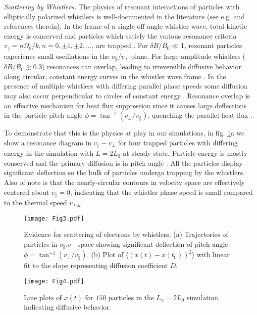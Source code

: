 \documentclass[%
 reprint,
superscriptaddress,
 amsmath,amssymb,
 aps,
]{revtex4-1}
\begin{document}
\textit{Scattering by Whistlers.} The physics of resonant interactions
of particles with elliptically polarized whistlers is well-documented
in the literature (see e.g. \cite{Roberg-Clark2016} and references
therein). In the frame of a single off-angle whistler wave, total
kinetic energy is conserved and particles which satisfy the various
resonance criteria $v_{\parallel} = n\Omega_{0}/k, n=0,\pm 1, \pm2,
...$, are trapped \cite{Karimabadi1992a}. For $\delta B/B_{0} \ll 1$,
resonant particles experience small oscillations in the
$v_{\parallel}/v_\perp$ plane. For large-amplitude whistlers ($\delta
B/B_{0} \gtrsim 0.3$) resonances can overlap, leading to irreversible
diffusive behavior along circular, constant energy curves in the
whistler wave frame \cite{Karimabadi1992a}. In the presence of
multiple whistlers with differing parallel phase speeds some diffusion
may also occur perpendicular to circles of constant energy
\cite{Karimabadi1992a}. Resonance overlap is an effective mechanism
for heat flux suppression since it causes large deflections in the particle
pitch angle $\phi = \tan^{-1}(v_{\perp}/v_{\parallel})$, quenching the
parallel heat flux \cite{Roberg-Clark2016}.

To demonstrate that this is the physics at play in our simulations, in
fig. \ref{fig:3}a we show a resonance diagram in
$v_{\parallel}-v_{\perp}$ for four trapped particles with differing
energy in the simulation with $L=2L_{0}$ at steady state. Particle
energy is mostly conserved and the primary diffusion is in pitch angle
\cite{Karimabadi1992a}. All the particles display significant
deflection so the bulk of particles undergo trapping by the
whistlers. Also of note is that the nearly-circular contours in
velocity space are effectively centered about $v_{\parallel}=0$,
indicating that the whistler phase speed is small compared to the
thermal speed $v_{Teh}$.
\begin{figure}
    \centering
    \texttt{[image: Fig3.pdf]}
    \caption{Evidence for scattering of electrons by whistlers. (a) Trajectories of particles in $v_{\parallel}$,$v_{\perp}$ space showing significant deflection of pitch angle $\phi = \tan^{-1}(v_{\perp}/v_{\parallel})$. (b) Plot of $\langle (x(t)-x(t_{0}))^{2} \rangle$ with linear fit to the slope representing diffusion coefficient $D$. }
    \label{fig:3}
\end{figure}
\begin{figure}
    \centering
    \texttt{[image: Fig4.pdf]}
    \caption{Line plots of $x(t)$ for $150$ particles in the $L_{x}=2L_{0}$ simulation indicating diffusive behavior.}
    \label{fig:4}
\end{figure}
\end{document}
